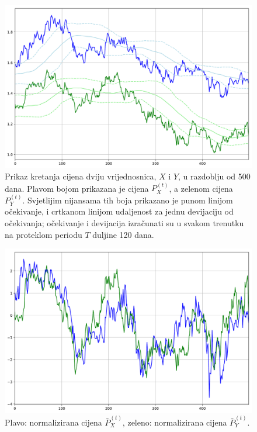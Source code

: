 \documentclass[lmodern, utf8, diplomski, numeric]{fer}
\newcommand{\norm}[1]{\bar{#1}}
\begin{document}
  \begin{figure}[p]
    \centering
    \includegraphics[width=1.0\linewidth]{graphics/ab-prices.pdf}
    \caption{
      Prikaz kretanja cijena dviju vrijednosnica, $X$ i $Y$, u razdoblju od 500 dana.
      Plavom bojom prikazana je cijena $P_X^{(t)}$, a zelenom cijena $P_Y^{(t)}$.
      Svjetlijim nijansama tih boja prikazano je punom linijom očekivanje, i crtkanom linijom udaljenost za jednu devijaciju od očekivanja; očekivanje i devijacija izračunati su u svakom trenutku na proteklom periodu $T$ duljine 120 dana.
    }
    \label{fig:ab-prices}
  \end{figure}

  \begin{figure}[p]
    \centering
    \includegraphics[width=1.0\linewidth]{graphics/ab-prices-norm.pdf}
    \caption{
      Plavo: normalizirana cijena $\norm{P}_X^{(t)}$, zeleno: normalizirana cijena $\norm{P}_Y^{(t)}$.
    }
    \label{fig:ab-prices-norm}
  \end{figure}
\end{document}
